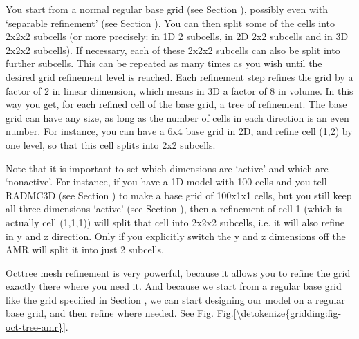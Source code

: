 \documentclass[letterpaper,10pt,english]{sphinxmanual}
\begin{document}
You start from a normal regular base grid (see Section
{\hyperref[\detokenize{gridding:sec-regular-grid}]{}}), possibly even with ‘separable refinement’ (see
Section {\hyperref[\detokenize{gridding:sec-separable-refinement}]{}}). You can then split some of the cells
into 2x2x2 subcells (or more precisely: in 1\sphinxhyphen{}D 2 subcells, in 2\sphinxhyphen{}D 2x2
subcells and in 3\sphinxhyphen{}D 2x2x2 subcells). If necessary, each of these 2x2x2
subcells can also be split into further subcells. This can be repeated as
many times as you wish until the desired grid refinement level is reached.
Each refinement step refines the grid by a factor of 2 in linear dimension,
which means in 3\sphinxhyphen{}D a factor of 8 in volume. In this way you get, for each
refined cell of the base grid, a tree of refinement. The base grid can have
any size, as long as the number of cells in each direction is an even
number. For instance, you can have a 6x4 base grid in 2\sphinxhyphen{}D, and refine cell
(1,2) by one level, so that this cell splits into 2x2 subcells.

Note that it is important to set which dimensions are ‘active’ and which
are ‘non\sphinxhyphen{}active’. For instance, if you have a 1\sphinxhyphen{}D model with 100 cells and
you tell RADMC\sphinxhyphen{}3D (see Section {\hyperref[\detokenize{inputoutputfiles:sec-amr-grid-oct-tree}]{}}) to make a base
grid of 100x1x1 cells, but you still keep all three dimensions ‘active’
(see Section {\hyperref[\detokenize{inputoutputfiles:sec-amr-grid-oct-tree}]{}}), then a refinement of cell 1
(which is actually cell (1,1,1)) will split that cell into 2x2x2 subcells,
i.e. it will also refine in y and z direction. Only if you explicitly
switch the y and z dimensions off the AMR will split it into just 2
subcells.

Oct\sphinxhyphen{}tree mesh refinement is very powerful, because it allows you to refine
the grid exactly there where you need it. And because we start from a
regular base grid like the grid specified in Section {\hyperref[\detokenize{gridding:sec-regular-grid}]{}},
we can start designing our model on a regular base grid, and then refine
where needed. See Fig. \hyperref[\detokenize{gridding:fig-oct-tree-amr}]{Fig.\@ \ref{\detokenize{gridding:fig-oct-tree-amr}}}.
\end{document}
